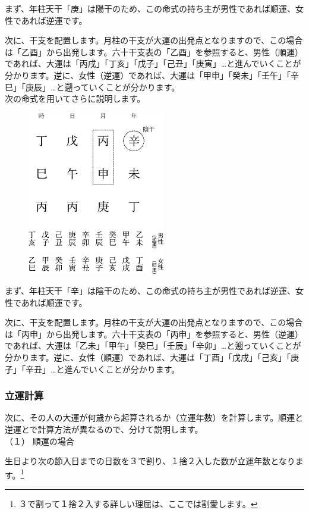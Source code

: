 \documentclass[a5paper,11pt,dvipdfmx]{tarticle}
\begin{document}
まず、年柱天干「庚」は陽干のため、この命式の持ち主が男性であれば順運、女性であれば逆運です。

次に、干支を配置します。月柱の干支が大運の出発点となりますので、この場合は「乙酉」から出発します。六十干支表の「乙酉」を参照すると、男性（順運）であれば、大運は「丙戌」「丁亥」「戊子」「己丑」「庚寅」…と進んでいくことが分かります。逆に、女性（逆運）であれば、大運は「甲申」「癸未」「壬午」「辛巳」「庚辰」…と遡っていくことが分かります。\\

次の命式を用いてさらに説明します。

\begin{figure}[h]
  \includegraphics[width=60mm,angle=90]{figs/figure4-3.eps}
\end{figure}

まず、年柱天干「辛」は陰干のため、この命式の持ち主が男性であれば逆運、女性であれば順運です。

次に、干支を配置します。月柱の干支が大運の出発点となりますので、この場合は「丙申」から出発します。六十干支表の「丙申」を参照すると、男性（逆運）であれば、大運は「乙未」「甲午」「癸巳」「壬辰」「辛卯」…と遡っていくことが分かります。逆に、女性（順運）であれば、大運は「丁酉」「戊戌」「己亥」「庚子」「辛丑」…と進んでいくことが分かります。

\subsubsection*{立運計算}
次に、その人の大運が何歳から起算されるか（立運年数）を計算します。順運と逆運とで計算方法が異なるので、分けて説明します。\\

\noindent
（１）	順運の場合

生日より次の節入日までの日数を３で割り、１捨２入した数が立運年数となります。\footnote{３で割って１捨２入する詳しい理屈は、ここでは割愛します。}\\
\end{document}
